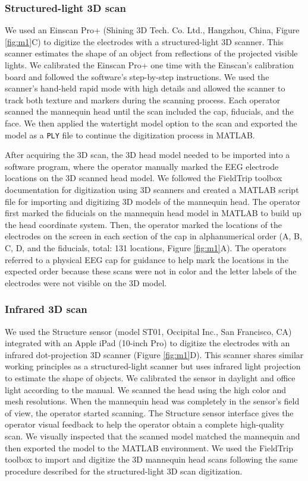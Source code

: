 \documentclass[../thesis_seyed.tex]{subfiles}
\begin{document}
\subsubsection{Structured-light 3D scan}
We used an Einscan Pro+ (Shining 3D Tech. Co. Ltd., Hangzhou, China, Figure \ref{fig:m1}C) to digitize the electrodes with a structured-light 3D scanner. This scanner estimates the shape of an object from reflections of the projected visible lights. We calibrated the Einscan Pro+ one time with the Einscan's calibration board and followed the software's step-by-step instructions. We used the scanner's hand-held rapid mode with high details and allowed the scanner to track both texture and markers during the scanning process. Each operator scanned the mannequin head until the scan included the cap, fiducials, and the face. We then applied the watertight model option to the scan and exported the model as a {\tt PLY} file to continue the digitization process in MATLAB.

After acquiring the 3D scan, the 3D head model needed to be imported into a software program, where the operator manually marked the EEG electrode locations on the 3D scanned head model. We followed the FieldTrip toolbox documentation for digitization using 3D scanners \cite{ft_scan_tut} and created a MATLAB script file for importing and digitizing 3D models of the mannequin head. The operator first marked the fiducials on the mannequin head model in MATLAB to build up the head coordinate system. Then, the operator marked the locations of the electrodes on the screen in each section of the cap in alphanumerical order (A, B, C, D, and the fiducials, total: 131 locations, Figure \ref{fig:m1}A). The operators referred to a physical EEG cap for guidance to help mark the locations in the expected order because these scans were not in color and the letter labels of the electrodes were not visible on the 3D model.

\subsubsection{Infrared 3D scan}
We used the Structure sensor (model ST01, Occipital Inc., San Francisco, CA) integrated with an Apple\tss{\textregistered} iPad (10-inch Pro) to digitize the electrodes with an infrared dot-projection 3D scanner (Figure \ref{fig:m1}D). This scanner shares similar working principles as a structured-light scanner but uses infrared light projection to estimate the shape of objects. We calibrated the sensor in daylight and office light according to the manual. We scanned the head using the high color and mesh resolutions. When the mannequin head was completely in the sensor's field of view, the operator started scanning. The Structure sensor interface gives the operator visual feedback to help the operator obtain a complete high-quality scan. We visually inspected that the scanned model matched the mannequin and then exported the model to the MATLAB environment. We used the FieldTrip toolbox to import and digitize the 3D mannequin head scans following the same procedure described for the structured-light 3D scan digitization. 
\end{document}
